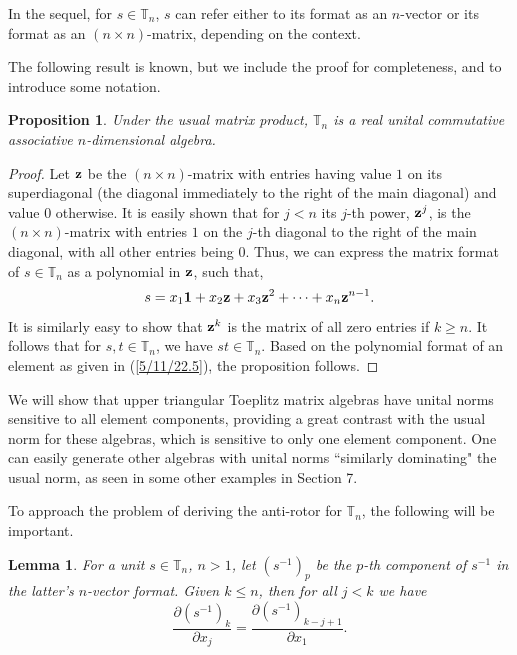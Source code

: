 \documentclass{amsart}
\newtheorem{proposition}[theorem]{Proposition}
\newtheorem{lemma}[theorem]{Lemma}
\theoremstyle{definition}
\numberwithin{theorem}{section}
\numberwithin{equation}{section}
\begin{document}
In the sequel, for $s\in \mathbb{T}_n$, $s$ can refer either to its format as an $n$-vector or its format as an $(n\times n)$-matrix, depending on the context.


The following result is known, but we include the proof for completeness, and to introduce some notation.  



 \begin{proposition}\label{5/10/22.1} Under the usual matrix product, $\mathbb{T}_n$ is a real unital commutative associative $n$-dimensional algebra.\end{proposition} 
 
 \begin{proof}
Let ${\bf z}$ be the $(n \times n)$-matrix with entries having value $1$ on its superdiagonal  (the diagonal immediately to the right of the main diagonal) and value $0$ otherwise.  It is easily shown that for $j<n$ its $j$-th power, ${\bf z}^j$, is the $(n\times n)$-matrix with entries $1$ on the $j$-th diagonal to the right of the main diagonal, with all other entries being $0$.   Thus, we can express the matrix format of $s\in\mathbb{T}_n$ as a polynomial in ${\bf z}$, such that,
\begin{equation}\label{5/11/22.5} s = x_1 {\bf 1} + x_2 {\bf z} + x_3 {\bf z}^2 + \cdots + x_n {\bf z}^{n-1}.\end{equation}  It is similarly easy to show that ${\bf z}^k$ is the matrix of all zero entries if $k\ge n$.  It follows that for $s,t\in \mathbb{T}_n$, we have $st\in \mathbb{T}_n$.   Based on the polynomial format of an element as given in (\ref{5/11/22.5}), the proposition follows.
 \end{proof}
 

We will show that upper triangular Toeplitz matrix algebras have unital norms sensitive to all element components, providing a great contrast with the usual norm for these algebras, which is sensitive to only one element component.  One can easily generate other algebras with unital norms ``similarly dominating" the usual norm, as seen in some other examples in Section 7.

To approach the problem of deriving the anti-rotor for $\mathbb{T}_n$, the following will be important.

\begin{lemma} \label{5/7/22.15} For a unit $s\in \mathbb{T}_n$,  $n>1$, let $\left( s^{-1} \right)_p$ be the $p$-th component of $s^{-1}$ in the latter's $n$-vector format.  Given $k\le n$, then for all $j<k$ we have \begin{equation}\label{5/6/22.10} \frac{\partial \left( s^{-1} \right)_k}{\partial x_j} = \frac{\partial \left( s^{-1} \right)_{k-j+1}}{\partial x_1}.\end{equation}
\end{lemma}
\end{document}
